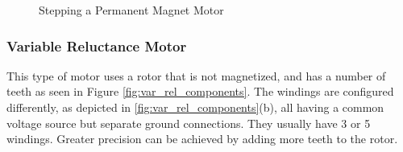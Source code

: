 \begin{figure}[htp]
    \begin{center}
    \hfill
    \hfill
  	\hfill
  	\caption{Stepping a Permanent Magnet Motor} \cite{figures}
  	\label{fig:stepping_perm_magn}
    \end{center}
\end{figure}
\subsubsection{Variable Reluctance Motor}
This type of motor uses a rotor that is not magnetized, and has a 
number of teeth as seen in 
Figure \ref{fig:var_rel_components}. The windings are configured 
differently, as depicted in 
\ref{fig:var_rel_components}(b), all having a common voltage source 
but separate ground 
connections.
They usually have 3 or 5 windings.
Greater precision can be achieved by adding more teeth to the 
rotor.


